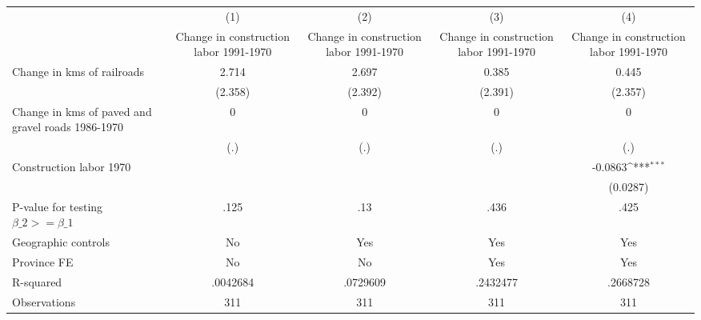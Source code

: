 {
\def\sym#1{\ifmmode^{#1}\else\(^{#1}\)\fi}
\begin{tabular}{l*{4}{c}}
\hline\hline
                &\multicolumn{1}{c}{(1)}&\multicolumn{1}{c}{(2)}&\multicolumn{1}{c}{(3)}&\multicolumn{1}{c}{(4)}\\
                &\multicolumn{1}{c}{Change in construction labor 1991-1970}&\multicolumn{1}{c}{Change in construction labor 1991-1970}&\multicolumn{1}{c}{Change in construction labor 1991-1970}&\multicolumn{1}{c}{Change in construction labor 1991-1970}\\
\hline
Change in kms of railroads&    2.714         &    2.697         &    0.385         &    0.445         \\
                &  (2.358)         &  (2.392)         &  (2.391)         &  (2.357)         \\
[1em]
Change in kms of paved and gravel roads 1986-1970&        0         &        0         &        0         &        0         \\
                &      (.)         &      (.)         &      (.)         &      (.)         \\
[1em]
Construction labor 1970&                  &                  &                  &  -0.0863\sym{***}\\
                &                  &                  &                  & (0.0287)         \\
\hline
P-value for testing $\beta\_{2} >= \beta\_{1}$&     .125         &      .13         &     .436         &     .425         \\
Geographic controls&       No         &      Yes         &      Yes         &      Yes         \\
Province FE     &       No         &       No         &      Yes         &      Yes         \\
R-squared       & .0042684         & .0729609         & .2432477         & .2668728         \\
Observations    &      311         &      311         &      311         &      311         \\
\hline\hline
\end{tabular}
}
